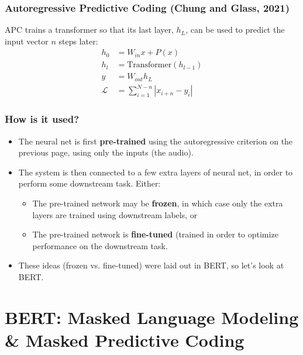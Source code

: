 \documentclass{beamer}
\begin{document}
\begin{frame}
  \frametitle{Autoregressive Predictive Coding (Chung and Glass, 2021)}

  APC trains a transformer so that its last layer, $h_L$, can be used
  to predict the input vector $n$ steps later:
  \begin{align*}
    h_0 &= W_{in}x + P(x)\\
    h_l &= \text{Transformer}(h_{l-1})\\
    y &= W_{out}h_L\\
    {\mathcal L} &= \sum_{i=1}^{N-n}\left|x_{i+n}-y_i\right|
  \end{align*}
  
\end{frame}

\begin{frame}
  \frametitle{How is it used?}

  \begin{itemize}
  \item The neural net is first {\bf pre-trained} using the
    autoregressive criterion on the previous page, using only the
    inputs (the audio).
  \item The system is then connected to a few extra layers of neural
    net, in order to perform some downstream task.  Either:
    \begin{itemize}
    \item The pre-trained network may be {\bf frozen}, in which case
      only the extra layers are trained using downstream labels, or
    \item The pre-trained network is {\bf fine-tuned} (trained in
      order to optimize performance on the downstream task.
    \end{itemize}
  \item These ideas (frozen vs. fine-tuned) were laid out in BERT, so
    let's look at BERT.
  \end{itemize}
\end{frame}


\section[BERT]{BERT: Masked Language Modeling \& Masked Predictive Coding}
\setcounter{subsection}{1}
\end{document}
